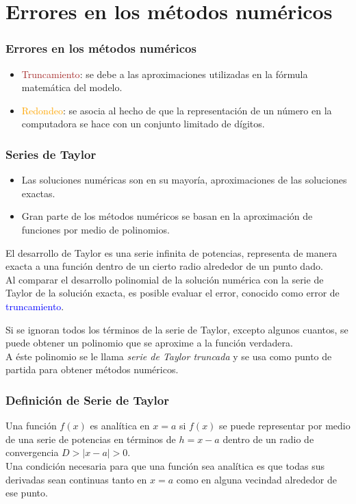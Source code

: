 \section{Errores en los métodos numéricos}
\begin{frame}
\frametitle{Errores en los métodos numéricos}
\begin{itemize}[<+->]
\item \textcolor{brown}{Truncamiento}: se debe a las aproximaciones utilizadas en la fórmula
matemática del modelo.
\item \textcolor{orange}{Redondeo}: se asocia al hecho de que la representación de un número en la computadora se hace con un conjunto limitado de dígitos.
\end{itemize}
\end{frame}
\begin{frame}
\frametitle{Series de Taylor}
\begin{itemize}[<+->]
\item Las soluciones numéricas son en su mayoría, aproximaciones de las soluciones exactas.
\item Gran parte de los métodos numéricos se basan en la aproximación de funciones por medio de polinomios.
\end{itemize}
\end{frame}
\begin{frame}
El desarrollo de Taylor es una serie infinita de potencias, representa de manera exacta a una función dentro de un cierto radio alrededor de un punto dado.
\\
\medskip
Al comparar el desarrollo polinomial de la solución numérica con la serie de Taylor de la solución exacta, es posible evaluar el error, conocido como error de \textcolor{blue}{truncamiento}.
\end{frame}
\begin{frame}
Si se ignoran todos los términos de la serie de Taylor, excepto algunos cuantos, se puede obtener un polinomio que se aproxime a la función verdadera.
\\
\medskip
A éste polinomio se le llama \textit{serie de Taylor truncada} y se usa como punto de partida para obtener métodos numéricos.
\end{frame}
\begin{frame}
\frametitle{Definición de Serie de Taylor}
Una función $f(x)$ es analítica en $x=a$ si $f(x)$ se puede representar por medio de una serie de potencias en términos de $h = x-a$ dentro de un radio de convergencia $D > |x-a|> 0$.
\\
\bigskip
Una condición necesaria para que una función sea analítica es que todas sus derivadas sean continuas tanto en $x=a$ como en alguna vecindad alrededor de ese punto.
\end{frame}
